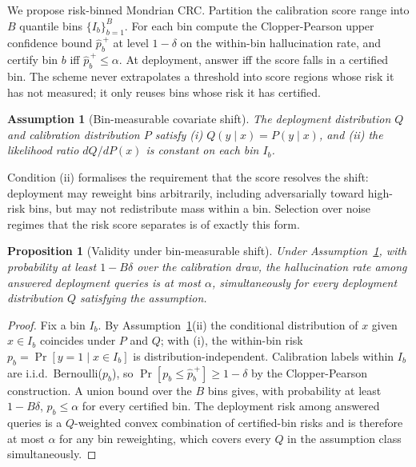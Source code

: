 \documentclass[sn-basic]{sn-jnl}
\theoremstyle{thmstyleone}
\newtheorem{proposition}{Proposition}
\newtheorem{assumption}{Assumption}
\theoremstyle{thmstyletwo}
\begin{document}
We propose risk-binned Mondrian CRC. Partition the calibration score
range into $B$ quantile bins $\{I_b\}_{b=1}^{B}$. For each bin compute
the Clopper-Pearson upper confidence bound $\widehat p^{\,+}_b$ at
level $1 - \delta$ on the within-bin hallucination rate, and certify
bin $b$ iff $\widehat p^{\,+}_b \le \alpha$. At deployment, answer iff
the score falls in a certified bin. The scheme never extrapolates a
threshold into score regions whose risk it has not measured; it only
reuses bins whose risk it has certified.

\begin{assumption}[Bin-measurable covariate shift]\label{ass:shift}
The deployment distribution $Q$ and calibration distribution $P$
satisfy (i) $Q(y \mid x) = P(y \mid x)$, and (ii) the likelihood ratio
$dQ/dP(x)$ is constant on each bin $I_b$.
\end{assumption}

Condition (ii) formalises the requirement that the score resolves the
shift: deployment may reweight bins arbitrarily, including
adversarially toward high-risk bins, but may not redistribute mass
within a bin. Selection over noise regimes that the risk score
separates is of exactly this form.

\begin{proposition}[Validity under bin-measurable shift]
\label{prop:riskbin}
Under Assumption~\ref{ass:shift}, with probability at least
$1 - B\delta$ over the calibration draw, the hallucination rate among
answered deployment queries is at most $\alpha$, simultaneously for
every deployment distribution $Q$ satisfying the assumption.
\end{proposition}

\begin{proof}
Fix a bin $I_b$. By Assumption~\ref{ass:shift}(ii) the conditional
distribution of $x$ given $x \in I_b$ coincides under $P$ and $Q$;
with (i), the within-bin risk $p_b = \Pr[y = 1 \mid x \in I_b]$ is
distribution-independent. Calibration labels within $I_b$ are i.i.d.\
Bernoulli($p_b$), so $\Pr[p_b \le \widehat p^{\,+}_b] \ge 1 - \delta$
by the Clopper-Pearson construction. A union bound over the $B$ bins
gives, with probability at least $1 - B\delta$, $p_b \le \alpha$ for
every certified bin. The deployment risk among answered queries is a
$Q$-weighted convex combination of certified-bin risks and is therefore
at most $\alpha$ for any bin reweighting, which covers every $Q$ in the
assumption class simultaneously.
\end{proof}
\end{document}
